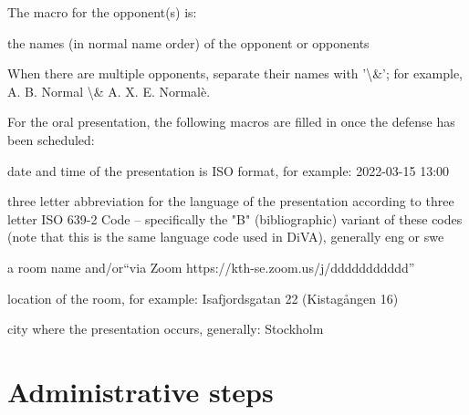 \documentclass[12pt, twoside]{article}
\begin{document}
The macro for the opponent(s) is: 
\begin{description}[leftmargin=!, labelwidth =\widthof{\texttt{\textbackslash secondAuthorsFirstname\{\}}}]
\item [\texttt{\textbackslash opponentsNames\{\}}] the names (in normal name order) of the opponent or opponents
\end{description}
When there are multiple opponents, separate their names with '\textbackslash \&'; for example, A. B. Normal \textbackslash \& A. X. E. Normalè.


For the oral presentation, the following macros are filled in once the defense has been scheduled:
\begin{description}[leftmargin=!, labelwidth =\widthof{\texttt{\textbackslash presentationDateAndTimeISO\{\}}}]
\item [\texttt{\textbackslash presentationDateAndTimeISO\{\}}] date and time of the presentation is ISO format, for example: 2022-03-15 13:00
\item [\texttt{\textbackslash presentationLanguage\{\}}] three letter abbreviation for the language of the presentation according to three letter ISO 639-2 Code – specifically the "B" (bibliographic) variant of these codes (note that this is the same language code used in \gls{DiVA}), generally eng or swe
\item [\texttt{\textbackslash presentationRoom\{\}}] a room name and/or\hspace*{\fill}\linebreak[4] \enquote{via Zoom https://kth-se.zoom.us/j/ddddddddddd}
\item [\texttt{\textbackslash presentationAddress\{\}}] location of the room, for example: Isafjordsgatan 22 (Kistagången 16)
\item [\texttt{\textbackslash presentationCity\{\}}] city where the presentation occurs, generally: Stockholm
\end{description}


\section{Administrative steps}
\label{sec:adminSteps}
\end{document}
